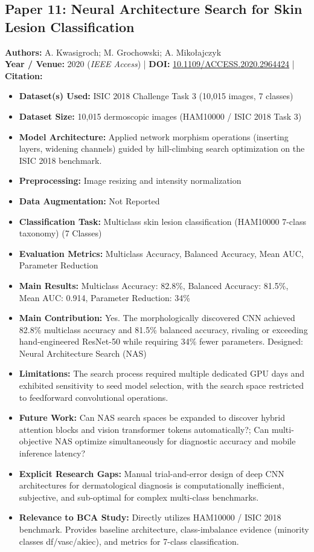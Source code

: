 \documentclass[11pt,a4paper]{article}
\begin{document}
\subsection{Paper 11: Neural Architecture Search for Skin Lesion Classification}
\textbf{Authors:} A. Kwasigroch; M. Grochowski; A. Mikołajczyk \\
\textbf{Year / Venue:} 2020 (\textit{IEEE Access}) | \textbf{DOI:} \href{https://doi.org/10.1109/ACCESS.2020.2964424}{10.1109/ACCESS.2020.2964424} | \textbf{Citation:} \cite{8950333}

\begin{itemize}\small
\item \textbf{Dataset(s) Used:} ISIC 2018 Challenge Task 3 (10,015 images, 7 classes)
\item \textbf{Dataset Size:} 10,015 dermoscopic images (HAM10000 / ISIC 2018 Task 3)
\item \textbf{Model Architecture:} Applied network morphism operations (inserting layers, widening channels) guided by hill-climbing search optimization on the ISIC 2018 benchmark.
\item \textbf{Preprocessing:} Image resizing and intensity normalization
\item \textbf{Data Augmentation:} Not Reported
\item \textbf{Classification Task:} Multiclass skin lesion classification (HAM10000 7-class taxonomy) (7 Classes)
\item \textbf{Evaluation Metrics:} Multiclass Accuracy, Balanced Accuracy, Mean AUC, Parameter Reduction
\item \textbf{Main Results:} Multiclass Accuracy: 82.8\%, Balanced Accuracy: 81.5\%, Mean AUC: 0.914, Parameter Reduction: 34\%
\item \textbf{Main Contribution:} Yes. The morphologically discovered CNN achieved 82.8\% multiclass accuracy and 81.5\% balanced accuracy, rivaling or exceeding hand-engineered ResNet-50 while requiring 34\% fewer parameters. Designed: Neural Architecture Search (NAS)
\item \textbf{Limitations:} The search process required multiple dedicated GPU days and exhibited sensitivity to seed model selection, with the search space restricted to feedforward convolutional operations.
\item \textbf{Future Work:} Can NAS search spaces be expanded to discover hybrid attention blocks and vision transformer tokens automatically?; Can multi-objective NAS optimize simultaneously for diagnostic accuracy and mobile inference latency?
\item \textbf{Explicit Research Gaps:} Manual trial-and-error design of deep CNN architectures for dermatological diagnosis is computationally inefficient, subjective, and sub-optimal for complex multi-class benchmarks.
\item \textbf{Relevance to BCA Study:} Directly utilizes HAM10000 / ISIC 2018 benchmark. Provides baseline architecture, class-imbalance evidence (minority classes df/vasc/akiec), and metrics for 7-class classification.
\end{itemize}
\end{document}
